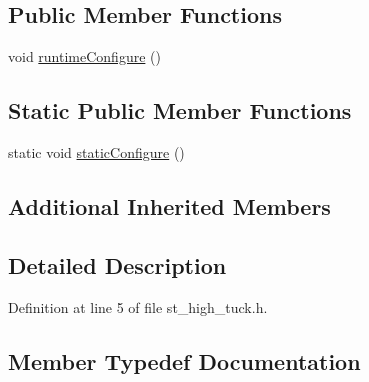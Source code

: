 \subsection*{Public Member Functions}
\begin{DoxyCompactItemize}
\item 
void \hyperlink{structsm__moveit__3_1_1StHighTuck_a9a247958dbc1a1ab3ef0a287f6688218}{runtime\+Configure} ()
\end{DoxyCompactItemize}
\subsection*{Static Public Member Functions}
\begin{DoxyCompactItemize}
\item 
static void \hyperlink{structsm__moveit__3_1_1StHighTuck_aec8c3461ff25307361fed9e292e2a00d}{static\+Configure} ()
\end{DoxyCompactItemize}
\subsection*{Additional Inherited Members}


\subsection{Detailed Description}


Definition at line 5 of file st\+\_\+high\+\_\+tuck.\+h.



\subsection{Member Typedef Documentation}
\mbox{\label{structsm__moveit__3_1_1StHighTuck_a14e727ee48019a59fb9f27737fb57a7e}} 

